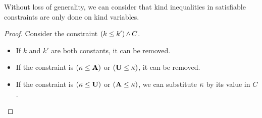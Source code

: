 \begin{lemma}
  Without loss of generality, we can consider that
  kind inequalities in satisfiable constraints
  are only done on kind variables. 

  \begin{proof}
    Consider the constraint $(k \leq k')\operatorname{\wedge} C$.
    \begin{itemize}
    \item If $k$ and $k'$ are both constants, it can be removed.
    \item If the constraint is $(\kappa \leq \mathbf{A})$ or $(\mathbf{U} \leq \kappa)$, it can be removed.
    \item If the constraint is $(\kappa \leq \mathbf{U})$ or $(\mathbf{A} \leq \kappa)$, we
      can substitute $\kappa$ by its value in $C$.
    \end{itemize}
  \end{proof}
\end{lemma}

